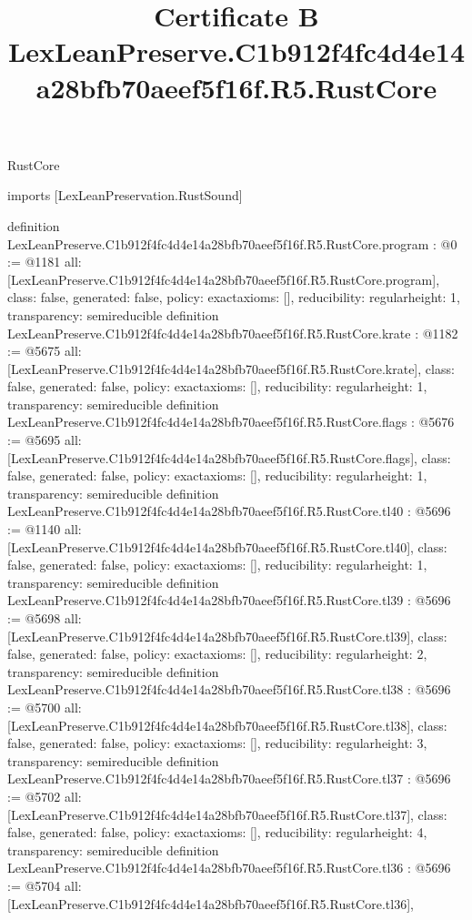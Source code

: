 \begin{lexlean}{RustCore}
\title{Certificate B LexLeanPreserve.C1b912f4fc4d4e14a28bfb70aeef5f16f.R5.RustCore}
\begin{coremodule}
imports [LexLeanPreservation.RustSound]

definition LexLeanPreserve.C1b912f4fc4d4e14a28bfb70aeef5f16f.R5.RustCore.program : @0 := @1181 {
  all: [LexLeanPreserve.C1b912f4fc4d4e14a28bfb70aeef5f16f.R5.RustCore.program],
  class: false,
  generated: false,
  policy: exact{axioms: []},
  reducibility: regular{height: 1},
  transparency: semireducible
}
definition LexLeanPreserve.C1b912f4fc4d4e14a28bfb70aeef5f16f.R5.RustCore.krate : @1182 := @5675 {
  all: [LexLeanPreserve.C1b912f4fc4d4e14a28bfb70aeef5f16f.R5.RustCore.krate],
  class: false,
  generated: false,
  policy: exact{axioms: []},
  reducibility: regular{height: 1},
  transparency: semireducible
}
definition LexLeanPreserve.C1b912f4fc4d4e14a28bfb70aeef5f16f.R5.RustCore.flags : @5676 := @5695 {
  all: [LexLeanPreserve.C1b912f4fc4d4e14a28bfb70aeef5f16f.R5.RustCore.flags],
  class: false,
  generated: false,
  policy: exact{axioms: []},
  reducibility: regular{height: 1},
  transparency: semireducible
}
definition LexLeanPreserve.C1b912f4fc4d4e14a28bfb70aeef5f16f.R5.RustCore.tl40 : @5696 := @1140 {
  all: [LexLeanPreserve.C1b912f4fc4d4e14a28bfb70aeef5f16f.R5.RustCore.tl40],
  class: false,
  generated: false,
  policy: exact{axioms: []},
  reducibility: regular{height: 1},
  transparency: semireducible
}
definition LexLeanPreserve.C1b912f4fc4d4e14a28bfb70aeef5f16f.R5.RustCore.tl39 : @5696 := @5698 {
  all: [LexLeanPreserve.C1b912f4fc4d4e14a28bfb70aeef5f16f.R5.RustCore.tl39],
  class: false,
  generated: false,
  policy: exact{axioms: []},
  reducibility: regular{height: 2},
  transparency: semireducible
}
definition LexLeanPreserve.C1b912f4fc4d4e14a28bfb70aeef5f16f.R5.RustCore.tl38 : @5696 := @5700 {
  all: [LexLeanPreserve.C1b912f4fc4d4e14a28bfb70aeef5f16f.R5.RustCore.tl38],
  class: false,
  generated: false,
  policy: exact{axioms: []},
  reducibility: regular{height: 3},
  transparency: semireducible
}
definition LexLeanPreserve.C1b912f4fc4d4e14a28bfb70aeef5f16f.R5.RustCore.tl37 : @5696 := @5702 {
  all: [LexLeanPreserve.C1b912f4fc4d4e14a28bfb70aeef5f16f.R5.RustCore.tl37],
  class: false,
  generated: false,
  policy: exact{axioms: []},
  reducibility: regular{height: 4},
  transparency: semireducible
}
definition LexLeanPreserve.C1b912f4fc4d4e14a28bfb70aeef5f16f.R5.RustCore.tl36 : @5696 := @5704 {
  all: [LexLeanPreserve.C1b912f4fc4d4e14a28bfb70aeef5f16f.R5.RustCore.tl36],
}
\end{coremodule}
\end{lexlean}
